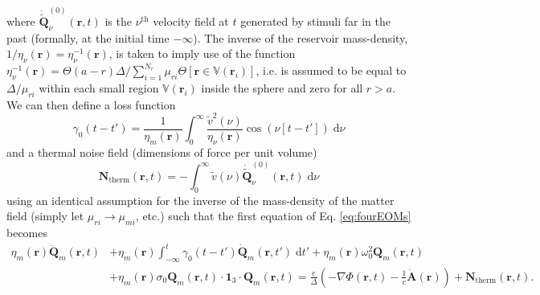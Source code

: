 where $\dot{\tilde{\mathbf{Q}}}^{(0)}_\nu(\mathbf{r},t)$ is the $\nu^\mathrm{th}$ velocity field at $t$ generated by stimuli far in the past (formally, at the initial time $-\infty$). The inverse of the reservoir mass-density, $1/\eta_\nu(\mathbf{r}) = \eta_\nu^{-1}(\mathbf{r})$, is taken to imply use of the function $\eta_\nu^{-1}(\mathbf{r}) = \Theta(a - r)\Delta/\sum_{i = 1}^{N_r}\mu_{ri}\Theta[\mathbf{r}\in\mathbb{V}(\mathbf{r}_i)]$, i.e. is assumed to be equal to $\Delta/\mu_{ri}$ within each small region $\mathbb{V}(\mathbf{r}_i)$ inside the sphere and zero for all $r > a$. We can then define a loss function
\begin{equation}
\gamma_0(t - t') = \frac{1}{\eta_m(\mathbf{r})}\int_0^\infty\frac{\tilde{v}^2(\nu)}{\eta_\nu(\mathbf{r})}\cos(\nu[t - t'])\;\mathrm{d}\nu
\end{equation}
and a thermal noise field (dimensions of force per unit volume)
\begin{equation}
\mathbf{N}_\mathrm{therm}(\mathbf{r},t) = -\int_0^\infty\tilde{v}(\nu)\dot{\tilde{\mathbf{Q}}}^{(0)}_\nu(\mathbf{r},t)\;\mathrm{d}\nu
\end{equation}
using an identical assumption for the inverse of the mass-density of the matter field (simply let $\mu_{ri}\to\mu_{mi}$, etc.) such that the first equation of Eq. \eqref{eq:fourEOMs} becomes
\begin{equation}\label{eq:matterEOM}
\begin{split}
\eta_m(\mathbf{r})\ddot{\mathbf{Q}}_m(\mathbf{r},t) &+ \eta_m(\mathbf{r})\int_{-\infty}^t\gamma_0(t - t')\dot{\mathbf{Q}}_m(\mathbf{r},t')\;\mathrm{d}t' + \eta_m(\mathbf{r})\omega_0^2\mathbf{Q}_m(\mathbf{r},t)\\
&+ \eta_m(\mathbf{r})\sigma_0\mathbf{Q}_m(\mathbf{r},t)\cdot\bm{1}_3\cdot\mathbf{Q}_m(\mathbf{r},t) = \frac{e}{\Delta}\left(-\nabla\Phi(\mathbf{r},t) - \frac{1}{c}\dot{\mathbf{A}}(\mathbf{r})\right) + \mathbf{N}_\mathrm{therm}(\mathbf{r},t).
\end{split}
\end{equation}

